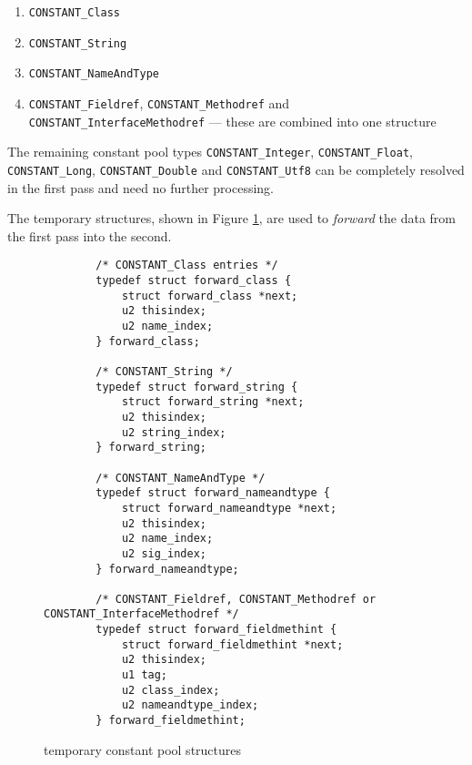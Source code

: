 \begin{enumerate}
 \item \texttt{CONSTANT\_Class}

 \item \texttt{CONSTANT\_String}

 \item \texttt{CONSTANT\_NameAndType}

 \item \texttt{CONSTANT\_Fieldref}, \texttt{CONSTANT\_Methodref} and
 \texttt{CONSTANT\_InterfaceMethodref} --- these are combined into one
 structure
\end{enumerate}

\begingroup
{}
The remaining constant pool types \texttt{CONSTANT\_Integer},
\texttt{CONSTANT\_Float}, \texttt{CONSTANT\_Long},
\texttt{CONSTANT\_Double} and \texttt{CONSTANT\_Utf8} can be
completely resolved in the first pass and need no further processing.

\endgroup

The temporary structures, shown in Figure
\ref{constantpoolstructures}, are used to \textit{forward} the data
from the first pass into the second.

\begin{figure}[h]
\begin{verbatim}
        /* CONSTANT_Class entries */
        typedef struct forward_class {
            struct forward_class *next;
            u2 thisindex;
            u2 name_index;
        } forward_class;

        /* CONSTANT_String */
        typedef struct forward_string {
            struct forward_string *next;
            u2 thisindex;
            u2 string_index;
        } forward_string;

        /* CONSTANT_NameAndType */
        typedef struct forward_nameandtype {
            struct forward_nameandtype *next;
            u2 thisindex;
            u2 name_index;
            u2 sig_index;
        } forward_nameandtype;

        /* CONSTANT_Fieldref, CONSTANT_Methodref or CONSTANT_InterfaceMethodref */
        typedef struct forward_fieldmethint {
            struct forward_fieldmethint *next;
            u2 thisindex;
            u1 tag;
            u2 class_index;
            u2 nameandtype_index;
        } forward_fieldmethint;
\end{verbatim}
\caption{temporary constant pool structures}
\label{constantpoolstructures}
\end{figure}

